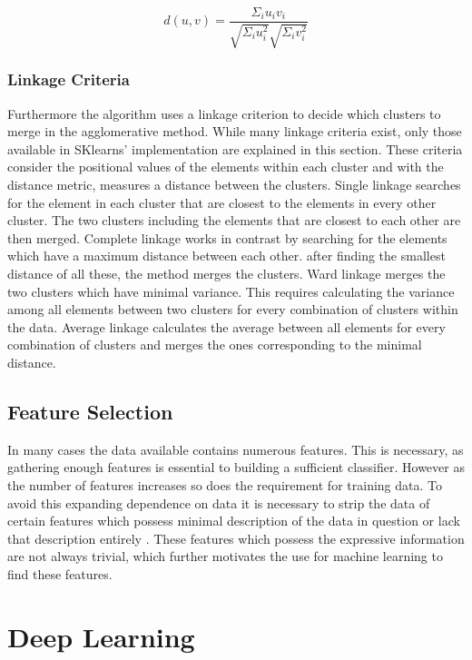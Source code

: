 \begin{equation}
\label{eqn:cosine}
d(u, v) = \frac{\Sigma_i u_iv_i}{\sqrt{\Sigma_i u_i^2}\sqrt{\Sigma_i v_i^2}}
\end{equation}

\subsubsection{Linkage Criteria}

Furthermore the algorithm uses a linkage criterion to decide which clusters to merge in the agglomerative method. While many linkage criteria exist, only those available in SKlearns' implementation are explained in this section\cite{scikit}. These criteria consider the positional values of the elements within each cluster and with the distance metric, measures a distance between the clusters. Single linkage searches for the element in each cluster that are closest to the elements in every other cluster. The two clusters including the elements that are closest to each other are then merged. Complete linkage works in contrast by searching for the elements which have a maximum distance between each other. after finding the smallest distance of all these, the method merges the clusters. Ward linkage merges the two clusters which have minimal variance. This requires calculating the variance among all elements between two clusters for every combination of clusters within the data. Average linkage calculates the average between all elements for every combination of clusters and merges the ones corresponding to the minimal distance.

\subsection{Feature Selection}

In many cases the data available contains numerous features. This is necessary, as gathering enough features is essential to building a sufficient classifier. However as the number of features increases so does the requirement for training data. To avoid this expanding dependence on data it is necessary to strip the data of certain features which possess minimal description of the data in question or lack that description entirely \cite{dash1997feature}. These features which possess the expressive information are not always trivial, which further motivates the use for machine learning to find these features.

\section{Deep Learning}

